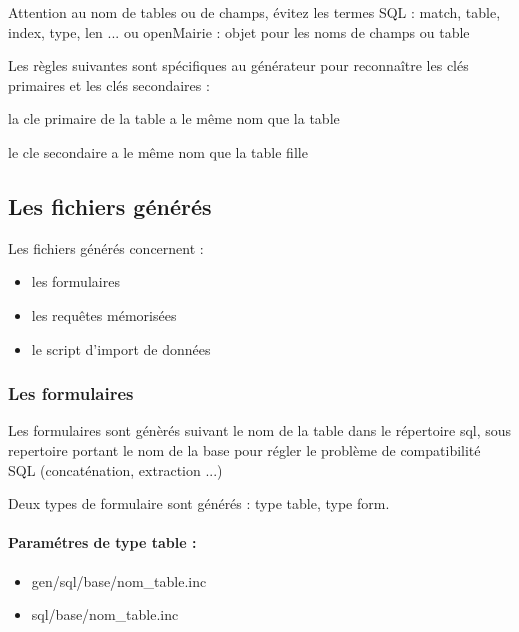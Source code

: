 \documentclass[letterpaper,10pt,french]{manual}
\begin{document}
Attention au nom de tables ou de champs, évitez les termes SQL : match, table, index, type, len ... ou openMairie : objet pour les noms de champs ou table

Les règles suivantes sont spécifiques au générateur pour reconnaître
les clés primaires et les clés secondaires :

la cle primaire de la table a le même nom que la table

le cle secondaire a le même nom que la table fille

\resetcurrentobjects
\hypertarget{--doc-generateur/fichier_genere}{}

\hypertarget{fichier-genere}{}\subsection{Les fichiers générés}

Les fichiers générés concernent :
\begin{itemize}
\item {} 
les formulaires

\item {} 
les requêtes mémorisées

\item {} 
le script d'import de données

\end{itemize}


\subsubsection{Les formulaires}

Les formulaires sont génèrés suivant le nom de la table dans le répertoire sql, sous repertoire portant le nom de la base pour régler le problème de compatibilité SQL (concaténation, extraction ...)

Deux types de formulaire sont générés : type table, type form.


\paragraph{Paramétres de type table :}
\begin{itemize}
\item {} 
gen/sql/base/nom\_table.inc

\item {} 
sql/base/nom\_table.inc

\end{itemize}
\end{document}

